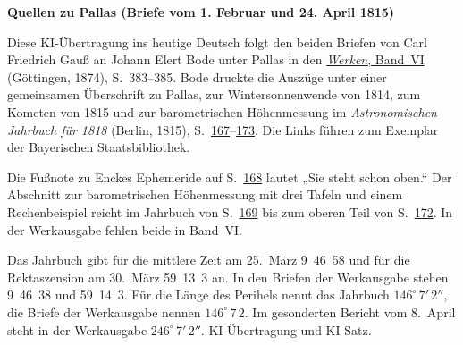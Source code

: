 \clearpage\thispagestyle{empty}
\begin{center}\textbf{Quellen zu Pallas (Briefe vom 1. Februar und 24. April 1815)}\end{center}
\noindent Diese KI-Übertragung ins heutige Deutsch folgt den beiden Briefen von Carl Friedrich Gauß an Johann Elert Bode unter Pallas in den \href{https://gdz.sub.uni-goettingen.de/id/PPN236007467}{\textit{Werken}, Band~VI} (Göttingen, 1874), S.~383--385. Bode druckte die Auszüge unter einer gemeinsamen Überschrift zu Pallas, zur Wintersonnenwende von 1814, zum Kometen von 1815 und zur barometrischen Höhenmessung im \textit{Astronomischen Jahrbuch für 1818} (Berlin, 1815), S.~\href{https://api.digitale-sammlungen.de/iiif/image/v2/bsb10538347_00175/full/1600,/0/default.jpg}{167}--\href{https://api.digitale-sammlungen.de/iiif/image/v2/bsb10538347_00181/full/1600,/0/default.jpg}{173}. Die Links führen zum Exemplar der Bayerischen Staatsbibliothek.
\par\smallskip\noindent Die Fußnote zu Enckes Ephemeride auf S.~\href{https://api.digitale-sammlungen.de/iiif/image/v2/bsb10538347_00176/full/1600,/0/default.jpg}{168} lautet „Sie steht schon oben.“ Der Abschnitt zur barometrischen Höhenmessung mit drei Tafeln und einem Rechenbeispiel reicht im Jahrbuch von S.~\href{https://api.digitale-sammlungen.de/iiif/image/v2/bsb10538347_00177/full/1600,/0/default.jpg}{169} bis zum oberen Teil von S.~\href{https://api.digitale-sammlungen.de/iiif/image/v2/bsb10538347_00180/full/1600,/0/default.jpg}{172}. In der Werkausgabe fehlen beide in Band~VI.
\par\smallskip\noindent Das Jahrbuch gibt für die mittlere Zeit am 25.~März 9~46~58 und für die Rektaszension am 30.~März 59~13~3 an. In den Briefen der Werkausgabe stehen 9~46~38 und 59~14~3. Für die Länge des Perihels nennt das Jahrbuch $146^\circ\,7'\,2''$, die Briefe der Werkausgabe nennen $146^\circ\,7\,2$. Im gesonderten Bericht vom 8.~April steht in der Werkausgabe $246^\circ\,7'\,2''$. KI-Übertragung und KI-Satz.
\clearpage
